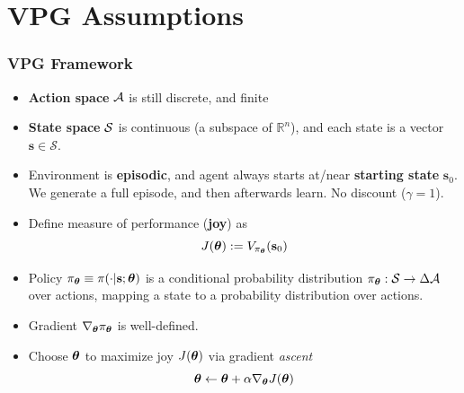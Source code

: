\section{VPG Assumptions}
\begin{frame}
    \frametitle{VPG Framework}
    \begin{itemize}
        \item \textbf{Action space} $\A$ is still discrete, and finite %
    \item \textbf{State space} $\S$ is continuous (a subspace of $\mathbb{R}^n$), and
    each state is a vector $\mathbf{s} \in \mathcal{S}$.
    \item Environment is \textbf{episodic}, and agent always starts at/near \textbf{starting 
    state} $\mathbf{s}_0$. We generate a full episode, and then afterwards learn. No discount
    ($\gamma = 1$).
    \item Define measure of performance (\textbf{joy}) as
    $$
    J(\bth) := V_{\pi_\bth}(\mathbf{s}_0)
    $$
    \item Policy $\pi_\bth \equiv \pi(\cdot | \mathbf{s}; \bth)$ is a conditional probability 
    distribution $\pi_\bth : \S \to \Delta \A$ over actions, mapping a state to a probability distribution over actions.
    \item Gradient $\nabla_\bth \pi_\bth$ is well-defined.
    \item Choose $\bth$ to maximize joy $J(\bth)$ via gradient \textit{ascent}
    $$
    \bth \leftarrow \bth + \alpha \nabla_{\bth} J(\bth) 
    $$
    

\end{itemize}
\end{frame}
